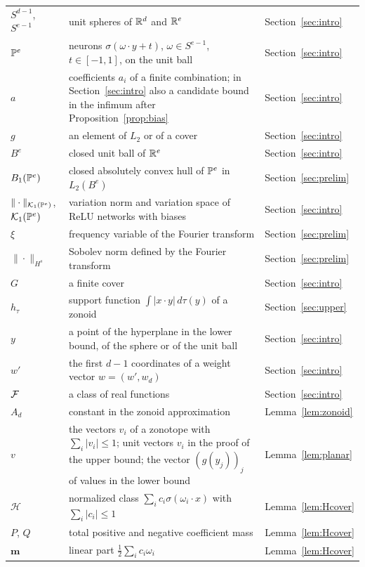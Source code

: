{\begin{longtable}{@{}p{}p{}l@{}}
$S^{d-1}$, $S^{e-1}$ & unit spheres of $\mathbb{R}^d$ and $\mathbb{R}^e$ & Section~\ref{sec:intro} \\
$\mathbb{P}^e$ & neurons $\sigma(\omega\cdot y+t)$, $\omega\in S^{e-1}$, $t\in[-1,1]$, on the unit ball & Section~\ref{sec:intro} \\
$a$ & coefficients $a_i$ of a finite combination; in Section~\ref{sec:intro} also a candidate bound in the infimum after Proposition~\ref{prop:bias} & Section~\ref{sec:intro} \\
$g$ & an element of $L_2$ or of a cover & Section~\ref{sec:intro} \\
$B^e$ & closed unit ball of $\mathbb{R}^e$ & Section~\ref{sec:intro} \\
$B_1(\mathbb{P}^e)$ & closed absolutely convex hull of $\mathbb{P}^e$ in $L_2(B^e)$ & Section~\ref{sec:prelim} \\
$\|\cdot\|_{\mathcal K_1(\mathbb{P}^e)}$, $\mathcal K_1(\mathbb{P}^e)$ & variation norm and variation space of ReLU networks with biases & Section~\ref{sec:intro} \\
$\xi$ & frequency variable of the Fourier transform & Section~\ref{sec:prelim} \\
$\|\cdot\|_{H^s}$ & Sobolev norm defined by the Fourier transform & Section~\ref{sec:prelim} \\
$G$ & a finite cover & Section~\ref{sec:intro} \\
$h_\tau$ & support function $\int|x\cdot y|\,d\tau(y)$ of a zonoid & Section~\ref{sec:upper} \\
$y$ & a point of the hyperplane in the lower bound, of the sphere or of the unit ball & Section~\ref{sec:intro} \\
$w'$ & the first $d-1$ coordinates of a weight vector $w=(w',w_d)$ & Section~\ref{sec:intro} \\
$\mathcal{F}$ & a class of real functions & Section~\ref{sec:intro} \\
$A_d$ & constant in the zonoid approximation & Lemma~\ref{lem:zonoid} \\
$v$ & the vectors $v_i$ of a zonotope with $\sum_i|v_i|\le1$; unit vectors $v_i$ in the proof of the upper bound; the vector $(g(y_j))_j$ of values in the lower bound & Lemma~\ref{lem:planar} \\
$\mathcal H$ & normalized class $\sum_ic_i\sigma(\omega_i\cdot x)$ with $\sum_i|c_i|\le1$ & Lemma~\ref{lem:Hcover} \\
$P$, $Q$ & total positive and negative coefficient mass & Lemma~\ref{lem:Hcover} \\
$\mathbf m$ & linear part $\tfrac12\sum_ic_i\omega_i$ & Lemma~\ref{lem:Hcover} \\

\end{longtable}}
